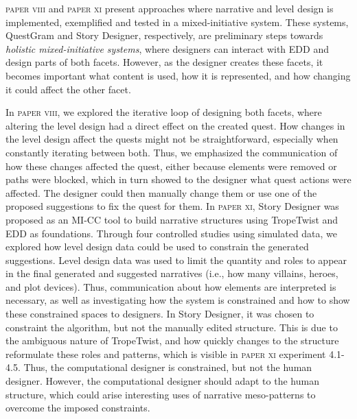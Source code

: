 \textsc{paper viii} and \textsc{paper xi} present approaches where narrative and level design is implemented, exemplified and tested in a mixed-initiative system. These systems, QuestGram and Story Designer, respectively, are preliminary steps towards \textit{holistic mixed-initiative systems}, where designers can interact with EDD and design parts of both facets. However, as the designer creates these facets, it becomes important what content is used, how it is represented, and how changing it could affect the other facet.

In \textsc{paper viii}, we explored the iterative loop of designing both facets, where altering the level design had a direct effect on the created quest. How changes in the level design affect the quests might not be straightforward, especially when constantly iterating between both. Thus, we emphasized the communication of how these changes affected the quest, either because elements were removed or paths were blocked, which in turn showed to the designer what quest actions were affected. The designer could then manually change them or use one of the proposed suggestions to fix the quest for them. In \textsc{paper xi}, Story Designer was proposed as an MI-CC tool to build narrative structures using TropeTwist and EDD as foundations. Through four controlled studies using simulated data, we explored how level design data could be used to constrain the generated suggestions. Level design data was used to limit the quantity and roles to appear in the final generated and suggested narratives (i.e., how many villains, heroes, and plot devices). Thus, communication about how elements are interpreted is necessary, as well as investigating how the system is constrained and how to show these constrained spaces to designers. In Story Designer, it was chosen to constraint the algorithm, but not the manually edited structure. This is due to the ambiguous nature of TropeTwist, and how quickly changes to the structure reformulate these roles and patterns, which is visible in \textsc{paper xi} experiment 4.1-4.5. Thus, the computational designer is constrained, but not the human designer. However, the computational designer should adapt to the human structure, which could arise interesting uses of narrative meso-patterns to overcome the imposed constraints.




